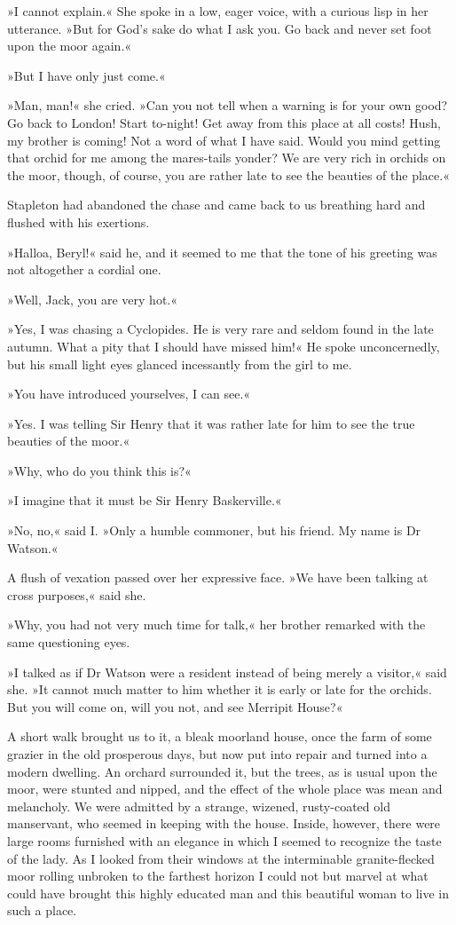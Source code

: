 »I cannot explain.« She spoke in a low, eager voice, with a curious lisp in her utterance. »But for God's sake do what I ask you. Go back and never set foot upon the moor again.«

»But I have only just come.«

»Man, man!« she cried. »Can you not tell when a warning is for your own good? Go back to London! Start to-night! Get away from this place at all costs! Hush, my brother is coming! Not a word of what I have said. Would you mind getting that orchid for me among the mares-tails yonder? We are very rich in orchids on the moor, though, of course, you are rather late to see the beauties of the place.«

Stapleton had abandoned the chase and came back to us breathing hard and flushed with his exertions.

»Halloa, Beryl!« said he, and it seemed to me that the tone of his greeting was not altogether a cordial one.

»Well, Jack, you are very hot.«

»Yes, I was chasing a Cyclopides. He is very rare and seldom found in the late autumn. What a pity that I should have missed him!« He spoke unconcernedly, but his small light eyes glanced incessantly from the girl to me.

»You have introduced yourselves, I can see.«

»Yes. I was telling Sir Henry that it was rather late for him to see the true beauties of the moor.«

»Why, who do you think this is?«

»I imagine that it must be Sir Henry Baskerville.«

»No, no,« said I. »Only a humble commoner, but his friend. My name is Dr Watson.«

A flush of vexation passed over her expressive face. »We have been talking at cross purposes,« said she.

»Why, you had not very much time for talk,« her brother remarked with the same questioning eyes.

»I talked as if Dr Watson were a resident instead of being merely a visitor,« said she. »It cannot much matter to him whether it is early or late for the orchids. But you will come on, will you not, and see Merripit House?«

A short walk brought us to it, a bleak moorland house, once the farm of some grazier in the old prosperous days, but now put into repair and turned into a modern dwelling. An orchard surrounded it, but the trees, as is usual upon the moor, were stunted and nipped, and the effect of the whole place was mean and melancholy. We were admitted by a strange, wizened, rusty-coated old manservant, who seemed in keeping with the house. Inside, however, there were large rooms furnished with an elegance in which I seemed to recognize the taste of the lady. As I looked from their windows at the interminable granite-flecked moor rolling unbroken to the farthest horizon I could not but marvel at what could have brought this highly educated man and this beautiful woman to live in such a place.

